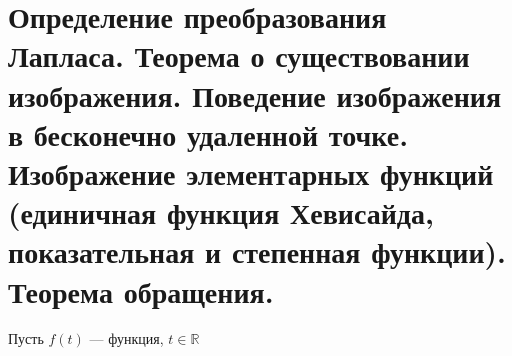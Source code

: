 \newpage
\section{Определение преобразования Лапласа. Теорема о существовании изображения. Поведение изображения в бесконечно удаленной точке. Изображение элементарных функций (единичная функция Хевисайда, показательная и степенная функции). Теорема обращения.}


Пусть $f(t)$ --- функция, $t \in \mathbb{R}$
